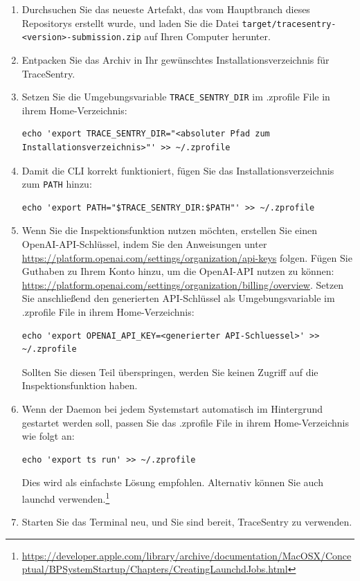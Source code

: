 \documentclass[a4paper,12pt]{report}
\begin{document}
    \begin{enumerate}
        \item Durchsuchen Sie das neueste Artefakt, das vom Hauptbranch dieses Repositorys erstellt wurde, und laden Sie die Datei
        \texttt{target/tracesentry-\textless{}version\textgreater{}-submission.zip} auf Ihren Computer herunter.
        \item Entpacken Sie das Archiv in Ihr gewünschtes Installationsverzeichnis für TraceSentry.
        \item Setzen Sie die Umgebungsvariable \texttt{TRACE\_SENTRY\_DIR} im .zprofile File in ihrem Home-Verzeichnis:
        \begin{lstlisting}[label={lst:lstlisting-mac-1}]
echo 'export TRACE_SENTRY_DIR="<absoluter Pfad zum Installationsverzeichnis>"' >> ~/.zprofile
        \end{lstlisting}
        \item Damit die CLI korrekt funktioniert, fügen Sie das Installationsverzeichnis zum \texttt{PATH} hinzu:
        \begin{lstlisting}[label={lst:lstlisting-mac-2}]
echo 'export PATH="$TRACE_SENTRY_DIR:$PATH"' >> ~/.zprofile
        \end{lstlisting}
        \item Wenn Sie die Inspektionsfunktion nutzen möchten, erstellen Sie einen OpenAI-API-Schlüssel, indem Sie den Anweisungen unter \url{https://platform.openai.com/settings/organization/api-keys} folgen.
        Fügen Sie Guthaben zu Ihrem Konto hinzu, um die OpenAI-API nutzen zu können: \url{https://platform.openai.com/settings/organization/billing/overview}.
        Setzen Sie anschließend den generierten API-Schlüssel als Umgebungsvariable im .zprofile File in ihrem Home-Verzeichnis:
        \begin{lstlisting}[label={lst:lstlisting-mac-3}]
echo 'export OPENAI_API_KEY=<generierter API-Schluessel>' >> ~/.zprofile
        \end{lstlisting}
        Sollten Sie diesen Teil überspringen, werden Sie keinen Zugriff auf die Inspektionsfunktion haben.
        \item Wenn der Daemon bei jedem Systemstart automatisch im Hintergrund gestartet werden soll, passen Sie das .zprofile File in ihrem Home-Verzeichnis wie folgt an:
        \begin{lstlisting}[label={lst:lstlisting-mac-4}]
echo 'export ts run' >> ~/.zprofile
        \end{lstlisting}
        Dies wird als einfachste Lösung empfohlen.
        Alternativ können Sie auch launchd verwenden.\footnote{\url{https://developer.apple.com/library/archive/documentation/MacOSX/Conceptual/BPSystemStartup/Chapters/CreatingLaunchdJobs.html}}
        \item Starten Sie das Terminal neu, und Sie sind bereit, TraceSentry zu verwenden.
    \end{enumerate}
\end{document}
